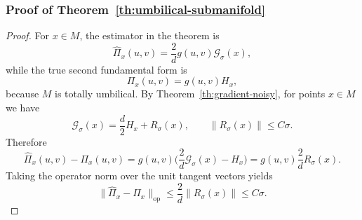 \documentclass[11pt]{article}
\theoremstyle{plain}
\theoremstyle{definition}
\begin{document}
\subsubsection{Proof of Theorem~\ref{th:umbilical-submanifold}}\label{sec:pf-umbilical submanifold}
\begin{proof}
For $x\in M$, the estimator in the theorem is
\[
\widehat\Pi_x(u,v)
=
\frac{2}{d}g(u,v)\mathcal G_\sigma(x),
\]
while the true second fundamental form is
\[
\Pi_x(u,v) = g(u,v)H_x,
\]
because $M$ is totally umbilical. By Theorem~\ref{th:gradient-noisy}, for points $x\in M$ we have
\[
\mathcal G_\sigma(x)
=
\frac{d}{2}H_x + R_\sigma(x),
\qquad
\|R_\sigma(x)\| \le C\sigma.
\]
Therefore
\[
\widehat\Pi_x(u,v)-\Pi_x(u,v)
=
g(u,v)\big(\frac{2}{d}\mathcal G_\sigma(x)-H_x\big)
=
g(u,v)\frac{2}{d}R_\sigma(x).
\]
Taking the operator norm over the unit tangent vectors yields
\[
\|\widehat\Pi_x-\Pi_x\|_{\mathrm{op}} 
\le
\frac{2}{d}\|R_\sigma(x)\|
\le C\sigma.
\]
\end{proof}
\end{document}
